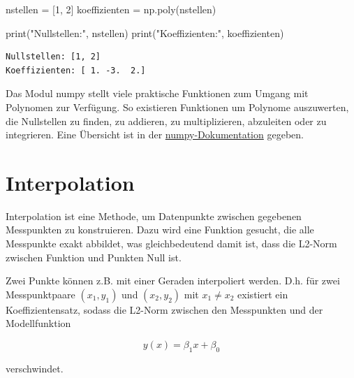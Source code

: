 \documentclass[
  letterpaper,
  DIV=11,
  numbers=noendperiod]{scrreprt}
\newenvironment{Shaded}{\begin{snugshade}}{\end{snugshade}}
\newcommand{\BuiltInTok}[1]{\textcolor[rgb]{0.00,0.23,0.31}{#1}}
\newcommand{\DecValTok}[1]{\textcolor[rgb]{0.68,0.00,0.00}{#1}}
\newcommand{\NormalTok}[1]{\textcolor[rgb]{0.00,0.23,0.31}{#1}}
\newcommand{\OperatorTok}[1]{\textcolor[rgb]{0.37,0.37,0.37}{#1}}
\newcommand{\StringTok}[1]{\textcolor[rgb]{0.13,0.47,0.30}{#1}}
\begin{document}
\begin{Shaded}
\begin{Highlighting}[]
\NormalTok{nstellen }\OperatorTok{=}\NormalTok{ [}\DecValTok{1}\NormalTok{, }\DecValTok{2}\NormalTok{]}
\NormalTok{koeffizienten }\OperatorTok{=}\NormalTok{ np.poly(nstellen)}

\BuiltInTok{print}\NormalTok{(}\StringTok{"Nullstellen:"}\NormalTok{, nstellen)}
\BuiltInTok{print}\NormalTok{(}\StringTok{"Koeffizienten:"}\NormalTok{, koeffizienten)}
\end{Highlighting}
\end{Shaded}

\begin{verbatim}
Nullstellen: [1, 2]
Koeffizienten: [ 1. -3.  2.]
\end{verbatim}

Das Modul numpy stellt viele praktische Funktionen zum Umgang mit
Polynomen zur Verfügung. So existieren Funktionen um Polynome
auszuwerten, die Nullstellen zu finden, zu addieren, zu multiplizieren,
abzuleiten oder zu integrieren. Eine Übersicht ist in der
\href{https://numpy.org/doc/stable/reference/routines.polynomials.poly1d.html}{numpy-Dokumentation}
gegeben.

\section{Interpolation}\label{interpolation}

Interpolation ist eine Methode, um Datenpunkte zwischen gegebenen
Messpunkten zu konstruieren. Dazu wird eine Funktion gesucht, die alle
Messpunkte exakt abbildet, was gleichbedeutend damit ist, dass die
L2-Norm zwischen Funktion und Punkten Null ist.

Zwei Punkte können z.B. mit einer Geraden interpoliert werden. D.h. für
zwei Messpunktpaare \((x_1, y_1)\) und \((x_2, y_2)\) mit
\(x_1\neq x_2\) existiert ein Koeffizientensatz, sodass die L2-Norm
zwischen den Messpunkten und der Modellfunktion

\[y(x) = \beta_1 x + \beta_0\]

verschwindet.
\end{document}
